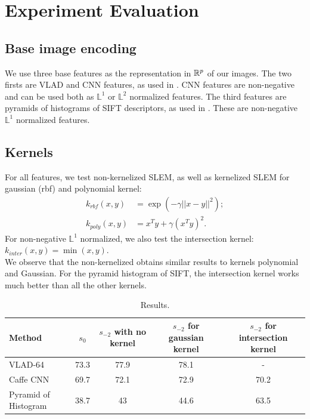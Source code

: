 \documentclass[12pt,letterpaper]{article}
\begin{document}
\section{Experiment Evaluation}
\subsection{Base image encoding}
We use three base features as the representation in $\mathbb{R}^p$ of our images. The two firsts are VLAD and CNN features, as used in \cite{ZePe15}. 
CNN features are non-negative and can be used both as $\mathbb{L}^1$ or $\mathbb{L}^2$ normalized features. The third features are pyramids of histograms of SIFT descriptors, as used in \cite{spk}. These are non-negative $\mathbb{L}^1$ normalized features.

\subsection{Kernels}
For all features, we test non-kernelized SLEM, as well as kernelized SLEM for gaussian (rbf) and polynomial kernel:
\begin{align}
k_{rbf}(x,y) &= \exp\left(-\gamma||x-y||^2\right);\\
k_{poly}(x,y) &= x^Ty+\gamma(x^Ty)^2.
\end{align}
For non-negative $\mathbb{L}^1$ normalized, we also test the intersection kernel: $k_{inter}(x,y) = \min(x,y).$\\
We observe that the non-kernelized obtains similar results to kernels polynomial and Gaussian. For the pyramid histogram of SIFT, the intersection kernel works much better than all the other kernels.

\begin{table}
\begin{center}
\begin{tabular}{|l|c|c|c|c|}
\hline
Method & $s_0$ & $s_{-2}$ with no kernel & $s_{-2}$ for gaussian kernel &  $s_{-2}$ for intersection kernel \\
\hline\hline
VLAD-64 & 73.3 & 77.9 & 78.1 & -\\
Caffe CNN & 69.7 & 72.1 & 72.9 & 70.2\\
Pyramid of Histogram & 38.7 & 43 & 44.6 & 63.5\\
\hline
\end{tabular}
\end{center}
\caption{Results.}
\end{table}



\end{document}
